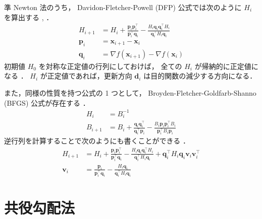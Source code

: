 準 Newton 法のうち，
Davidon-Fletcher-Powell (DFP) 公式では次のように $H_i$ を算出する
\cite[Section 9.3]{Luenberger2003}, \cite[Section 10.9]{Press2007}．
\begin{align}
    H_{i+1}  & = H_i + \frac{\bm{p}_i \bm{p}_i^\top}{\bm{p}_i^\top \bm{q}_i}
    - \frac{H_i \bm{q}_i \bm{q}_i^\top H_i}{\bm{q}_i^\top H_i \bm{q}_i}      \\
    \bm{p}_i & = \bm{x}_{i+1} - \bm{x}_i                                     \\
    \bm{q}_i & = \nabla f(\bm{x}_{i+1}) - \nabla f(\bm{x}_i)
\end{align}
初期値 $H_0$ を対称な正定値の行列にしておけば，
全ての $H_i$ が帰納的に正定値になる
\cite[Section 9.3]{Luenberger2003}．
$H_i$ が正定値であれば，更新方向 $\bm{d}_i$ は目的関数の減少する方向になる．

また，同様の性質を持つ公式の 1 つとして，
Broyden-Fletcher-Goldfarb-Shanno (BFGS) 公式が存在する
\cite[Section 9.4]{Luenberger2003}．
\begin{align}
    H_i     & = B_i^{-1}                                                    \\
    B_{i+1} & = B_i + \frac{\bm{q}_i \bm{q}_i^\top}{\bm{q}_i^\top \bm{p}_i}
    - \frac{B_i \bm{p}_i \bm{p}_i^\top B_i}{\bm{p}_i^\top B_i \bm{p}_i}
\end{align}
逆行列を計算することで次のようにも書くことができる
\cite[Section 10.9]{Press2007}．
\begin{align}
    H_{i+1}  & = H_i + \frac{\bm{p}_i \bm{p}_i^\top}{\bm{p}_i^\top \bm{q}_i}
    - \frac{H_i \bm{q}_i \bm{q}_i^\top H_i}{\bm{q}_i^\top H_i \bm{q}_i}
    + \bm{q}_i^\top H_i \bm{q}_i \bm{v}_i \bm{v}_i^\top                      \\
    \bm{v}_i & = \frac{\bm{p}_i}{\bm{p}_i^\top \bm{q}_i}
    - \frac{H_i \bm{q}_i}{\bm{q}_i^\top H_i \bm{q}_i}
\end{align}

\section{共役勾配法}

